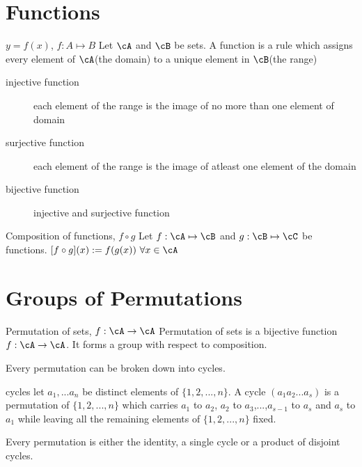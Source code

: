 \documentclass[11pt, oneside, dvipdfmx]{book}
\begin{document}
\section{Functions}
\begin{MyDefinition}{$y=f(x)$, $f:A \mapsto B$}
		Let $\cA$ and $\cB$ be sets. A function is a rule which assigns every element of $\cA$(the domain) to a unique element in $\cB$(the range)
	\end{MyDefinition}

\begin{description}
	\item[injective function] each element of the range is the image of no more than one element of domain
	\item[surjective function] each element of the range is the image of atleast one element of the domain
	\item[bijective function] injective and surjective function
\end{description}

\begin{MyDefinition}{Composition of functions, $f \circ g$}
	Let $f:\cA \mapsto \cB$ and $g:\cB \mapsto \cC$ be functions. 
	$[f \circ g](x) :=f(g(x)) ~\forall x \in \cA$
\end{MyDefinition}


\section{Groups of Permutations}

\begin{MyDefinition}{Permutation of sets, $f:\cA \rightarrow \cA$}
	Permutation of sets is a bijective function $f:\cA \rightarrow \cA$. It forms a group with respect to composition.
	
	\end{MyDefinition}
Every permutation can be broken down into cycles.

\begin{MyDefinition}{cycles}
	let $a_1,...a_n$ be distinct elements of $\{1,2,...,n\}$. A cycle  $(a_1a_2...a_s)$ is a permutation of $\{1,2,...,n\}$ which carries $a_1$ to $a_2$, $a_2$ to $a_3$,...,$a_{s-1}$ to $a_s$ and $a_s$ to $a_1$ while leaving all the remaining elements of $\{1,2,...,n\}$ fixed.
	
	\end{MyDefinition}
	
	\begin{MyTheorem}
	Every permutation is either the identity, a single cycle or a product of disjoint cycles.
	\end{MyTheorem}
	
\end{document}
